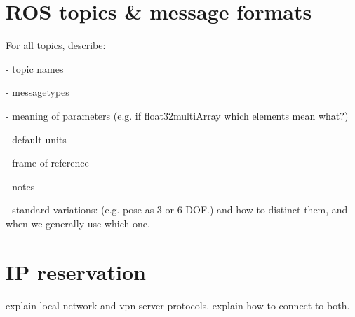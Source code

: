 \documentclass[]{article}
\begin{document}
\section{ROS topics \& message formats}
For all topics, describe:

- topic names

- messagetypes

- meaning of parameters (e.g. if float32multiArray which elements mean what?)

- default units

- frame of reference

- notes

- standard variations: (e.g. pose as 3 or 6 DOF.) and how to distinct them, and when we generally use which one. 


\section{IP reservation}
explain local network and vpn server protocols.
explain how to connect to both. 
\end{document}
